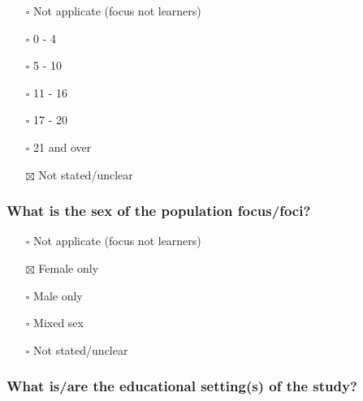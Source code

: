\documentclass[
  doc, a4paper]{apa7}
\providecommand{\tightlist}{%
  \setlength{\itemsep}{0pt}\setlength{\parskip}{0pt}}
\begin{document}
\begin{itemize}
\tightlist
\item[$\square$]
  Not applicate (focus not learners)\\
\item[$\square$]
  0 - 4\\
\item[$\square$]
  5 - 10\\
\item[$\square$]
  11 - 16\\
\item[$\square$]
  17 - 20\\
\item[$\square$]
  21 and over\\
\item[$\boxtimes$]
  Not stated/unclear
\end{itemize}

\subsubsection{What is the sex of the population focus/foci?}\label{what-is-the-sex-of-the-population-focusfoci}

\begin{itemize}
\tightlist
\item[$\square$]
  Not applicate (focus not learners)\\
\item[$\boxtimes$]
  Female only\\
\item[$\square$]
  Male only\\
\item[$\square$]
  Mixed sex\\
\item[$\square$]
  Not stated/unclear
\end{itemize}

\subsubsection{What is/are the educational setting(s) of the study?}\label{what-isare-the-educational-settings-of-the-study}
\end{document}
